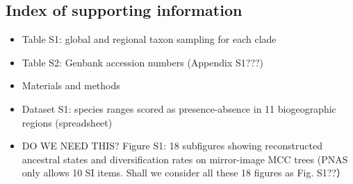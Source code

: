 \subsection{Index of supporting information}

\begin{itemize}
\item Table S1: global and regional taxon sampling for each clade
\item Table S2: Genbank accession numbers (Appendix S1???)
\item Materials and methods
\item Dataset S1: species ranges scored as presence-absence in 11 biogeographic regions (spreadsheet)
\item DO WE NEED THIS? Figure S1: 18 subfigures showing reconstructed ancestral states and diversification rates on mirror-image MCC trees (PNAS only allows 10 SI items. Shall we consider all these 18 figures as Fig. S1??）
\end{itemize}